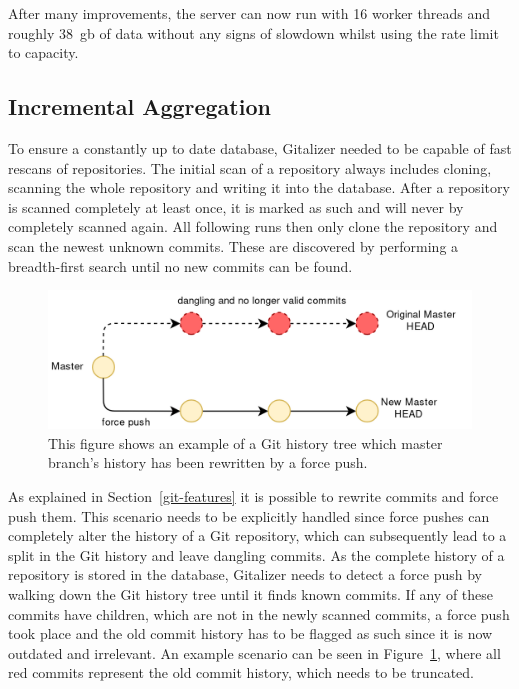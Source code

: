 After many improvements, the server can now run with 16 worker threads and roughly 38~\ac{gb} of data without any signs of slowdown whilst using the rate limit to capacity.


\subsection{Incremental Aggregation}
To ensure a constantly up to date database, Gitalizer needed to be capable of fast rescans of repositories.
The initial scan of a repository always includes cloning, scanning the whole repository and writing it into the database.
After a repository is scanned completely at least once, it is marked as such and will never by completely scanned again.
All following runs then only clone the repository and scan the newest unknown commits.
These are discovered by performing a breadth-first search until no new commits can be found.

\begin{figure}[H]
\includegraphics[scale=0.3]{./graphs/git-history-rewrite}
\centering
\caption{This figure shows an example of a Git history tree which master branch's history has been rewritten by a force push.}\label{fig:truncated-git-history}
\end{figure}

As explained in Section~\ref{git-features} it is possible to rewrite commits and force push them.
This scenario needs to be explicitly handled since force pushes can completely alter the history of a Git repository, which can subsequently lead to a split in the Git history and leave dangling commits.
As the complete history of a repository is stored in the database, Gitalizer needs to detect a force push by walking down the Git history tree until it finds known commits.
If any of these commits have children, which are not in the newly scanned commits, a force push took place and the old commit history has to be flagged as such since it is now outdated and irrelevant.
An example scenario can be seen in Figure~\ref{fig:truncated-git-history}, where all red commits represent the old commit history, which needs to be truncated.


